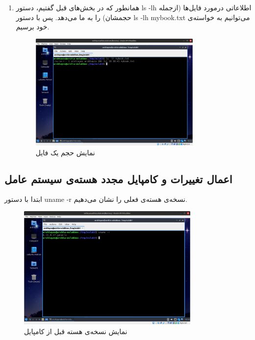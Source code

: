 \documentclass[12pt]{article}
\begin{document}
\begin{enumerate}
        \item 
        همانطور که در بخش‌های قبل گفتیم، دستور 
        \textenglish{ls -lh}
        اطلاعاتی درمورد فایل‌ها (ازجمله حجمشان) را به ما می‌دهد. پس با دستور 
        \textenglish{ls -lh mybook.txt}
        می‌توانیم به خواسته‌ی خود برسیم. 

        \begin{figure}[H]
		\centering
		\includegraphics[width=0.8\textwidth]{report1-resources/27.png}
		\caption{نمایش حجم یک فایل}
	\end{figure}
        \end{enumerate}

        \subsection{اعمال تغییرات و کامپایل مجدد هسته‌ی سیستم عامل}
        ابتدا با دستور
        \textenglish{uname -r}
        نسخه‌ی هسته‌ی فعلی را نشان می‌دهیم.

        \begin{figure}[H]
		\centering
		\includegraphics[width=0.8\textwidth]{report1-resources/28.png}
		\caption{نمایش نسخه‌ی هسته قبل از کامپایل}
	\end{figure}
\end{document}

